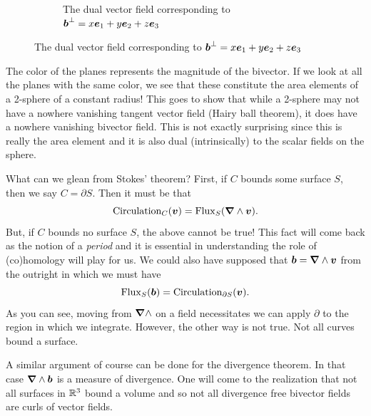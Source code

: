 \documentclass{article}
\begin{document}
\begin{figure}[H]
\begin{subfigure}[b]{0.49\textwidth}
    \caption{The dual vector field corresponding to $\boldsymbol{b}^\perp =x \boldsymbol{e}_{1} + y\boldsymbol{e}_{2} + z\boldsymbol{e}_{3}$}
    \label{fig:vector_field}
\end{subfigure}
\end{figure}
The color of the planes represents the magnitude of the bivector. If we look at all the planes with the same color, we see that these constitute the area elements of a 2-sphere of a constant radius! This goes to show that while a 2-sphere may not have a nowhere vanishing tangent vector field (Hairy ball theorem), it does have a nowhere vanishing bivector field. This is not exactly surprising since this is really the area element and it is also dual (intrinsically) to the scalar fields on the sphere.

What can we glean from Stokes' theorem? First, if $C$ bounds some surface $S$, then we say $C=\partial S$. Then it must be that
\begin{equation}
    \mathrm{Circulation}_{C}(\boldsymbol{v}) = \mathrm{Flux}_{S}(\boldsymbol{\nabla} \wedge \boldsymbol{v}).
\end{equation}
But, if $C$ bounds no surface $S$, the above cannot be true! This fact will come back as the notion of a \emph{period} and it is essential in understanding the role of (co)homology will play for us. We could also have supposed that $\boldsymbol{b}=\boldsymbol{\nabla} \wedge \boldsymbol{v}$ from the outright in which we must have
\begin{equation}
    \mathrm{Flux}_S (\boldsymbol{b})=\mathrm{Circulation}_{\partial S}(\boldsymbol{v}).
\end{equation}
As you can see, moving from $\boldsymbol{\nabla} \wedge$ on a field necessitates we can apply $\partial$ to the region in which we integrate. However, the other way is not true. Not all curves bound a surface.  

A similar argument of course can be done for the divergence theorem. In that case $\boldsymbol{\nabla} \wedge \boldsymbol{b}$ is a measure of divergence. One will come to the realization that not all surfaces in $\mathbb{R}^3$ bound a volume and so not all divergence free bivector fields are curls of vector fields.
\end{document}
